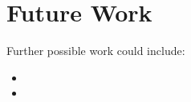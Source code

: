 \documentclass[report.tex]{subfiles}
\begin{document}
\section{Future Work}
Further possible work could include:

\begin{itemize}
  \item 
  \item 
\end{itemize}
\end{document}

